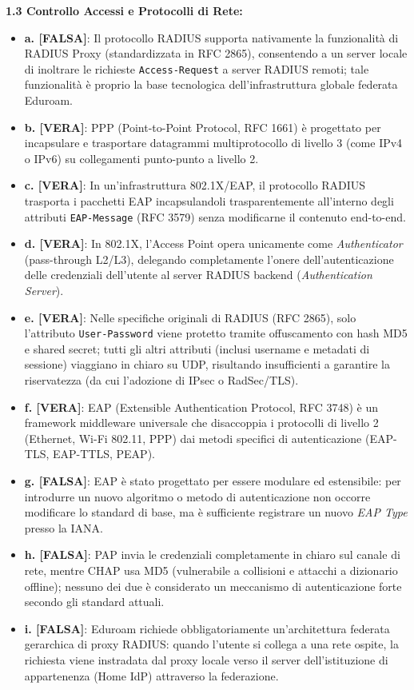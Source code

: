 \documentclass[11pt,a4paper]{article}
\begin{document}
\begin{solutionbox}
\textbf{1.3 Controllo Accessi e Protocolli di Rete:}
\begin{itemize}
    \item \textbf{a. [FALSA]}: Il protocollo RADIUS supporta nativamente la funzionalità di RADIUS Proxy (standardizzata in RFC 2865), consentendo a un server locale di inoltrare le richieste \texttt{Access-Request} a server RADIUS remoti; tale funzionalità è proprio la base tecnologica dell'infrastruttura globale federata Eduroam.
    \item \textbf{b. [VERA]}: PPP (Point-to-Point Protocol, RFC 1661) è progettato per incapsulare e trasportare datagrammi multiprotocollo di livello 3 (come IPv4 o IPv6) su collegamenti punto-punto a livello 2.
    \item \textbf{c. [VERA]}: In un'infrastruttura 802.1X/EAP, il protocollo RADIUS trasporta i pacchetti EAP incapsulandoli trasparentemente all'interno degli attributi \texttt{EAP-Message} (RFC 3579) senza modificarne il contenuto end-to-end.
    \item \textbf{d. [VERA]}: In 802.1X, l'Access Point opera unicamente come \textit{Authenticator} (pass-through L2/L3), delegando completamente l'onere dell'autenticazione delle credenziali dell'utente al server RADIUS backend (\textit{Authentication Server}).
    \item \textbf{e. [VERA]}: Nelle specifiche originali di RADIUS (RFC 2865), solo l'attributo \texttt{User-Password} viene protetto tramite offuscamento con hash MD5 e shared secret; tutti gli altri attributi (inclusi username e metadati di sessione) viaggiano in chiaro su UDP, risultando insufficienti a garantire la riservatezza (da cui l'adozione di IPsec o RadSec/TLS).
    \item \textbf{f. [VERA]}: EAP (Extensible Authentication Protocol, RFC 3748) è un framework middleware universale che disaccoppia i protocolli di livello 2 (Ethernet, Wi-Fi 802.11, PPP) dai metodi specifici di autenticazione (EAP-TLS, EAP-TTLS, PEAP).
    \item \textbf{g. [FALSA]}: EAP è stato progettato per essere modulare ed estensibile: per introdurre un nuovo algoritmo o metodo di autenticazione non occorre modificare lo standard di base, ma è sufficiente registrare un nuovo \textit{EAP Type} presso la IANA.
    \item \textbf{h. [FALSA]}: PAP invia le credenziali completamente in chiaro sul canale di rete, mentre CHAP usa MD5 (vulnerabile a collisioni e attacchi a dizionario offline); nessuno dei due è considerato un meccanismo di autenticazione forte secondo gli standard attuali.
    \item \textbf{i. [FALSA]}: Eduroam richiede obbligatoriamente un'architettura federata gerarchica di proxy RADIUS: quando l'utente si collega a una rete ospite, la richiesta viene instradata dal proxy locale verso il server dell'istituzione di appartenenza (Home IdP) attraverso la federazione.
\end{itemize}


\end{solutionbox}
\end{document}
